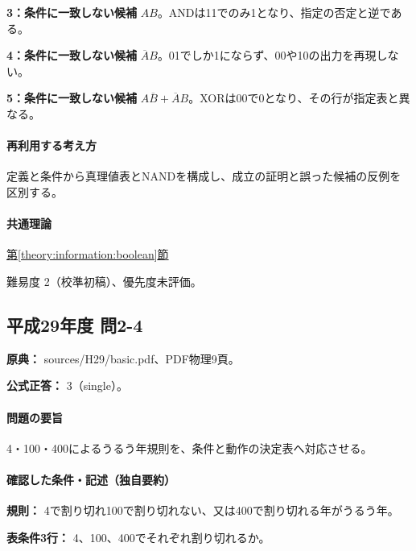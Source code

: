 \noindent\textbf{3：条件に一致しない候補} \(AB\)。ANDは11でのみ1となり、指定の否定と逆である。\par

\noindent\textbf{4：条件に一致しない候補} \(\overline A B\)。01でしか1にならず、00や10の出力を再現しない。\par

\noindent\textbf{5：条件に一致しない候補} \(A\overline B+\overline A B\)。XORは00で0となり、その行が指定表と異なる。\par

\paragraph{再利用する考え方} 定義と条件から真理値表とNANDを構成し、成立の証明と誤った候補の反例を区別する。

\paragraph{共通理論} \hyperref[theory:information:boolean]{第\ref*{theory:information:boolean}節}

\par 難易度 2（校準初稿）、優先度未評価。

\subsection{平成29年度 問2-4}
\label{q:h29-reg-basic-2-4}

\noindent\textbf{原典：} sources/H29/basic.pdf、PDF物理9頁。

\textbf{公式正答：} 3（single）。

\paragraph{問題の要旨} 4・100・400によるうるう年規則を、条件と動作の決定表へ対応させる。

\paragraph{確認した条件・記述（独自要約）}\mbox{}\par

\noindent\textbf{規則：} 4で割り切れ100で割り切れない、又は400で割り切れる年がうるう年。\par

\noindent\textbf{表条件3行：} 4、100、400でそれぞれ割り切れるか。\par


